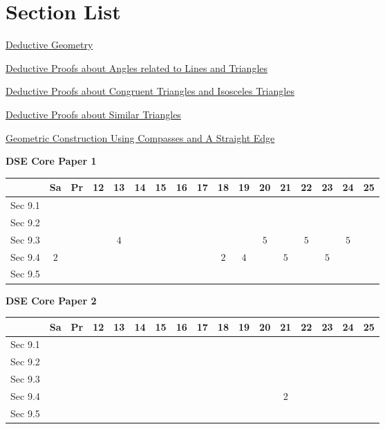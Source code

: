 \documentclass[12pt, a4paper]{article}
\begin{document}
\section*{Section List}
\begin{enumx}[label=Sec 9.\arabic*\ ]
\item \hyperref[section:2-9-1]{Deductive Geometry}
\item \hyperref[section:2-9-2]{Deductive Proofs about Angles related to Lines and Triangles}
\item \hyperref[section:2-9-3]{Deductive Proofs about Congruent Triangles and Isosceles Triangles}
\item \hyperref[section:2-9-4]{Deductive Proofs about Similar Triangles}
\item \hyperref[section:2-9-5]{Geometric Construction Using Compasses and A Straight Edge \NF}
\end{enumx}
\begin{absolutelynopagebreak}
\begin{center}
\textbf{DSE Core Paper 1}
\end{center}
\begin{center}
\begin{tabular}{|l|c|c|c|c|c|c|c|c|c|c|c|c|c|c|c|c|}
\hline
        & Sa & Pr & 12 & 13 & 14 & 15 & 16 & 17 & 18 & 19 & 20 & 21 & 22 & 23 & 24 & 25 \\\hline\hline
Sec 9.1 &  &  &  &  &  &  &  &  &  &  &  &  &  &  &  &  \\\hline
Sec 9.2 &  &  &  &  &  &  &  &  &  &  &  &  &  &  &  &  \\\hline
Sec 9.3 &  &  &  &  $4$ &  &  &  &  &  &  &  $5$ &  &  $5$ &  &  $5$ &  \\\hline
Sec 9.4 &  $2$ &  &  &  &  &  &  &  &  $2$ &  $4$ &  &  $5$ &  &  $5$ &  &  \\\hline
Sec 9.5 &  &  &  &  &  &  &  &  &  &  &  &  &  &  &  &  \\\hline
\end{tabular}
\end{center}
\end{absolutelynopagebreak}
\begin{absolutelynopagebreak}
\begin{center}
\textbf{DSE Core Paper 2}
\end{center}
\begin{center}
\begin{tabular}{|l|c|c|c|c|c|c|c|c|c|c|c|c|c|c|c|c|}
\hline
        & Sa & Pr & 12 & 13 & 14 & 15 & 16 & 17 & 18 & 19 & 20 & 21 & 22 & 23 & 24 & 25 \\\hline\hline
Sec 9.1 &  &  &  &  &  &  &  &  &  &  &  &  &  &  &  &  \\\hline
Sec 9.2 &  &  &  &  &  &  &  &  &  &  &  &  &  &  &  &  \\\hline
Sec 9.3 &  &  &  &  &  &  &  &  &  &  &  &  &  &  &  &  \\\hline
Sec 9.4 &  &  &  &  &  &  &  &  &  &  &  &  $2$ &  &  &  &  \\\hline
Sec 9.5 &  &  &  &  &  &  &  &  &  &  &  &  &  &  &  &  \\\hline
\end{tabular}
\end{center}
\end{absolutelynopagebreak}
\end{document}
